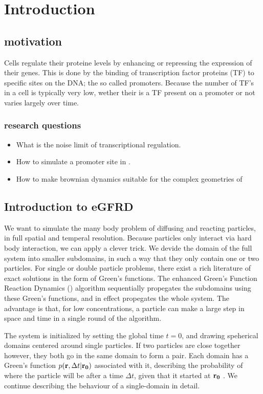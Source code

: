 \section{Introduction}

\subsection{motivation}
Cells regulate their proteine levels by enhancing or repressing the expression of their genes. This is done by the binding of transcription factor proteins (TF) to specific sites on the DNA; the so called promoters. Because the number of TF's in a cell is typically very low, wether their is a TF present on a promoter or not varies largely over time. 

\subsubsection{research questions}
\begin{itemize}
 \item What is the noise limit of transcriptional regulation.
 \item How to simulate a promoter site in \GFRD.
 \item How to make brownian dynamics suitable for the complex geometries of \GFRD
\end{itemize}



\subsection{Introduction to eGFRD}
We want to simulate the many body problem of diffusing and reacting particles, in full spatial and temperal resolution. Because particles only interact via hard body interaction, we can apply a clever trick. We devide the domain of the full system into smaller subdomains, in such a way that they only contain one or two particles. For single or double particle problems, there exist a rich literature of exact solutions in the form of Green's functions. The enhanced Green's Function Reaction Dynamics (\GFRD) algorithm sequentially propegates the subdomains using these Green's functions, and in effect propegates the whole system. \cite{VanZon2006}\cite{VanZon2005}\cite{Takahashi2010} The advantage is that, for low concentrations, a particle can make a large step in space and time in a single round of the algorithm.

The system is initialized by setting the global time $t=0$, and drawing speherical domains centered around single particles. If two particles are close together however, they both go in the same domain to form a pair. Each domain has a Green's function $p({\bf r}, \Delta t|{\bf r_0})$ associated with it, describing the probability of where the particle will be after a time $\Delta t$, given that it started at ${\bf r_0}$ \cite{Carslaw1959}. We continue describing the behaviour of a single-domain in detail.

